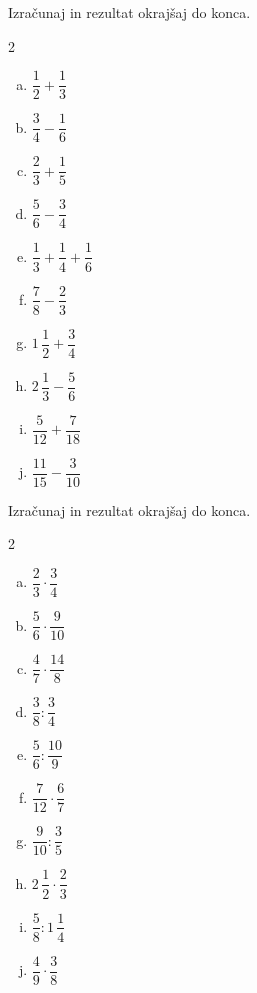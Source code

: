 \documentclass[a4paper,12pt]{letter}
\begin{document}
\begin{naloga}
Izra\v{c}unaj in rezultat okraj\v{s}aj do konca.

\begin{multicols}{2}
\begin{enumerate}[a.)]
\item $\dfrac{1}{2}+\dfrac{1}{3}$
\item $\dfrac{3}{4}-\dfrac{1}{6}$
\item $\dfrac{2}{3}+\dfrac{1}{5}$
\item $\dfrac{5}{6}-\dfrac{3}{4}$
\item $\dfrac{1}{3}+\dfrac{1}{4}+\dfrac{1}{6}$
\item $\dfrac{7}{8}-\dfrac{2}{3}$
\item $1\,\dfrac{1}{2}+\dfrac{3}{4}$
\item $2\,\dfrac{1}{3}-\dfrac{5}{6}$
\item $\dfrac{5}{12}+\dfrac{7}{18}$
\item $\dfrac{11}{15}-\dfrac{3}{10}$
\end{enumerate}
\end{multicols}
\end{naloga}

\begin{naloga}
Izra\v{c}unaj in rezultat okraj\v{s}aj do konca.

\begin{multicols}{2}
\begin{enumerate}[a.)]
\item $\dfrac{2}{3}\cdot\dfrac{3}{4}$
\item $\dfrac{5}{6}\cdot\dfrac{9}{10}$
\item $\dfrac{4}{7}\cdot\dfrac{14}{8}$
\item $\dfrac{3}{8}:\dfrac{3}{4}$
\item $\dfrac{5}{6}:\dfrac{10}{9}$
\item $\dfrac{7}{12}\cdot\dfrac{6}{7}$
\item $\dfrac{9}{10}:\dfrac{3}{5}$
\item $2\,\dfrac{1}{2}\cdot\dfrac{2}{3}$
\item $\dfrac{5}{8}:1\,\dfrac{1}{4}$
\item $\dfrac{4}{9}\cdot\dfrac{3}{8}$
\end{enumerate}
\end{multicols}
\end{naloga}
\end{document}

